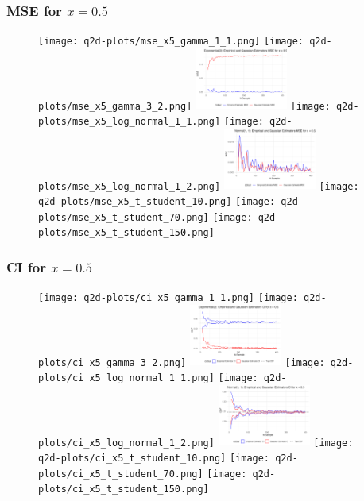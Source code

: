\documentclass{article}
\begin{document}
{\subsubsection*{MSE for $x = 0.5$}

\begin{figure}[H]
  \centering
  \texttt{[image: q2d-plots/mse\_x5\_gamma\_1\_1.png]}
  \texttt{[image: q2d-plots/mse\_x5\_gamma\_3\_2.png]}
  \includegraphics[width=115px]{q2d-plots/mse_x5_exponential.png}
  \texttt{[image: q2d-plots/mse\_x5\_log\_normal\_1\_1.png]}
  \texttt{[image: q2d-plots/mse\_x5\_log\_normal\_1\_2.png]}
  \includegraphics[width=115px]{q2d-plots/mse_x5_normal.png}
  \texttt{[image: q2d-plots/mse\_x5\_t\_student\_10.png]}
  \texttt{[image: q2d-plots/mse\_x5\_t\_student\_70.png]}
  \texttt{[image: q2d-plots/mse\_x5\_t\_student\_150.png]}
  \label{fig:mse_x5}
\end{figure}

\subsubsection*{CI for $x = 0.5$}

\begin{figure}[H]
  \centering
  \texttt{[image: q2d-plots/ci\_x5\_gamma\_1\_1.png]}
  \texttt{[image: q2d-plots/ci\_x5\_gamma\_3\_2.png]}
  \includegraphics[width=115px]{q2d-plots/ci_x5_exponential.png}
  \texttt{[image: q2d-plots/ci\_x5\_log\_normal\_1\_1.png]}
  \texttt{[image: q2d-plots/ci\_x5\_log\_normal\_1\_2.png]}
  \includegraphics[width=115px]{q2d-plots/ci_x5_normal.png}
  \texttt{[image: q2d-plots/ci\_x5\_t\_student\_10.png]}
  \texttt{[image: q2d-plots/ci\_x5\_t\_student\_70.png]}
  \texttt{[image: q2d-plots/ci\_x5\_t\_student\_150.png]}
  \label{fig:ci_x5}
\end{figure}

}
\end{document}
